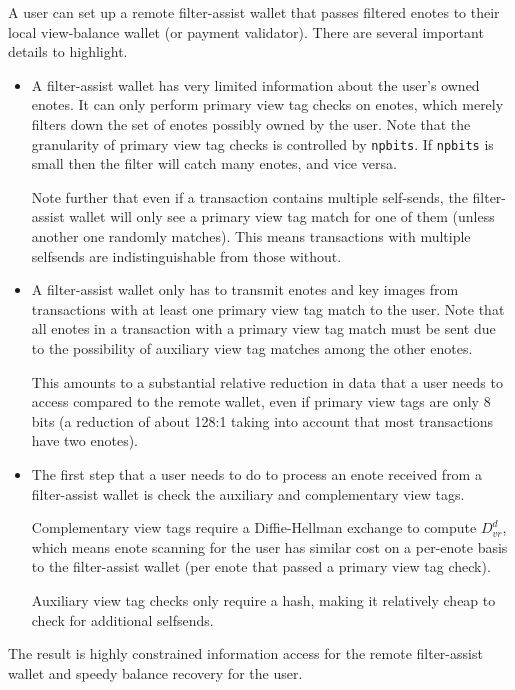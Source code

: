 A user can set up a remote filter-assist wallet that passes filtered enotes to their local view-balance wallet (or payment validator). There are several important details to highlight.
\begin{itemize}
    \item A filter-assist wallet has very limited information about the user's owned enotes. It can only perform primary view tag checks on enotes, which merely filters down the set of enotes possibly owned by the user. Note that the granularity of primary view tag checks is controlled by {\tt npbits}. If {\tt npbits} is small then the filter will catch many enotes, and vice versa.

    Note further that even if a transaction contains multiple self-sends, the filter-assist wallet will only see a primary view tag match for one of them (unless another one randomly matches). This means transactions with multiple selfsends are indistinguishable from those without.

    \item A filter-assist wallet only has to transmit enotes and key images from transactions with at least one primary view tag match to the user. Note that all enotes in a transaction with a primary view tag match must be sent due to the possibility of auxiliary view tag matches among the other enotes.

    This amounts to a substantial relative reduction in data that a user needs to access compared to the remote wallet, even if primary view tags are only 8 bits (a reduction of about 128:1 taking into account that most transactions have two enotes).

    \item The first step that a user needs to do to process an enote received from a filter-assist wallet is check the auxiliary and complementary view tags.
    
    Complementary view tags require a Diffie-Hellman exchange to compute $D^d_{vr}$, which means enote scanning for the user has similar cost on a per-enote basis to the filter-assist wallet (per enote that passed a primary view tag check).

    Auxiliary view tag checks only require a hash, making it relatively cheap to check for additional selfsends.
\end{itemize}

The result is highly constrained information access for the remote filter-assist wallet and speedy balance recovery for the user.


